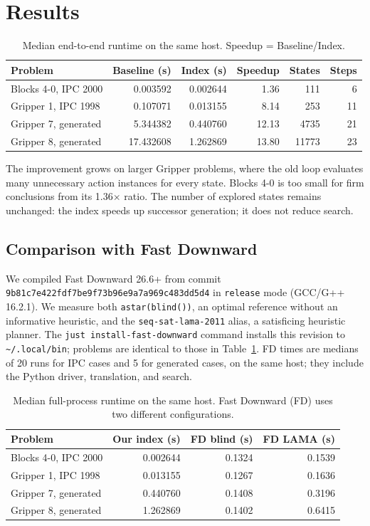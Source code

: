 \documentclass[10pt,a4paper]{article}
\begin{document}
\section{Results}
\begin{table}[h]
\centering
\small
\begin{tabular}{lrrrrr}
\toprule
Problem & Baseline (s) & Index (s) & Speedup & States & Steps \\
\midrule
Blocks 4-0, IPC 2000 & 0.003592 & 0.002644 & 1.36 & 111 & 6 \\
Gripper 1, IPC 1998 & 0.107071 & 0.013155 & 8.14 & 253 & 11 \\
Gripper 7, generated & 5.344382 & 0.440760 & 12.13 & 4735 & 21 \\
Gripper 8, generated & 17.432608 & 1.262869 & 13.80 & 11773 & 23 \\
\bottomrule
\end{tabular}
\caption{Median end-to-end runtime on the same host. Speedup = Baseline/Index.}
\label{tab:ours}
\end{table}

The improvement grows on larger Gripper problems, where the old loop
evaluates many unnecessary action instances for every state. Blocks 4-0
is too small for firm conclusions from its 1.36$\times$ ratio. The
number of explored states remains unchanged: the index speeds up
successor generation; it does not reduce search.

\subsection{Comparison with Fast Downward}
We compiled Fast Downward 26.6+ from commit
\texttt{9b81c7e422fdf7be9f73b96e9a7a969c483dd5d4} in \texttt{release}
mode (GCC/G++ 16.2.1). We measure both \texttt{astar(blind())}, an
optimal reference without an informative heuristic, and the
\texttt{seq-sat-lama-2011} alias, a satisficing heuristic planner.
The \texttt{just install-fast-downward} command installs this revision
to \texttt{\~{}/.local/bin}; problems are identical to those in
Table~\ref{tab:ours}. FD times are medians of 20 runs for IPC cases and
5 for generated cases, on the same host; they include the Python driver,
translation, and search.

\begin{table}[h]
\centering
\small
\begin{tabular}{lrrr}
\toprule
Problem & Our index (s) & FD blind (s) & FD LAMA (s) \\
\midrule
Blocks 4-0, IPC 2000 & 0.002644 & 0.1324 & 0.1539 \\
Gripper 1, IPC 1998 & 0.013155 & 0.1267 & 0.1636 \\
Gripper 7, generated & 0.440760 & 0.1408 & 0.3196 \\
Gripper 8, generated & 1.262869 & 0.1402 & 0.6415 \\
\bottomrule
\end{tabular}
\caption{Median full-process runtime on the same host.
Fast Downward (FD) uses two different configurations.}
\label{tab:fd}
\end{table}
\end{document}
